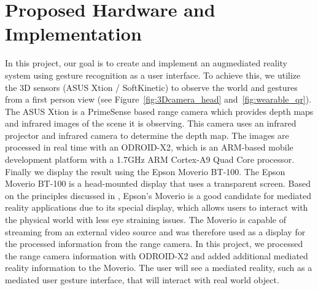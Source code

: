 \section{Proposed Hardware and Implementation}
In this project, our goal is to create and implement an augmediated reality system using gesture recognition as a user interface. To achieve this, we utilize the 3D sensors (ASUS Xtion / SoftKinetic) to observe the world and gestures from a first person view (see Figure~\ref{fig:3Dcamera_head} and~\ref{fig:wearable_qr}). The ASUS Xtion is a PrimeSense based range camera which provides depth maps and infrared images of the scene it is observing. This camera uses an infrared projector and infrared camera to determine the depth map. The images are processed in real time with an ODROID-X2, which is an ARM-based mobile development platform with a 1.7GHz ARM Cortex-A9 Quad Core processor. Finally we display the result using the Epson Moverio BT-100. 
The Epson Moverio BT-100 is a head-mounted display that uses a transparent screen. Based on the principles discussed in \cite{mann2001wearable}, Epson's Moverio is a good candidate for mediated reality applications due to its special display, which allows users to interact with the physical world with less eye straining issues. The Moverio is capable of streaming from an external video source and was therefore used as a display for the processed information from the range camera. In this project, we processed the range camera information with ODROID-X2 and added additional mediated reality information to the Moverio. The user will see a mediated reality, such as a mediated user gesture interface, that will interact with real world object.

